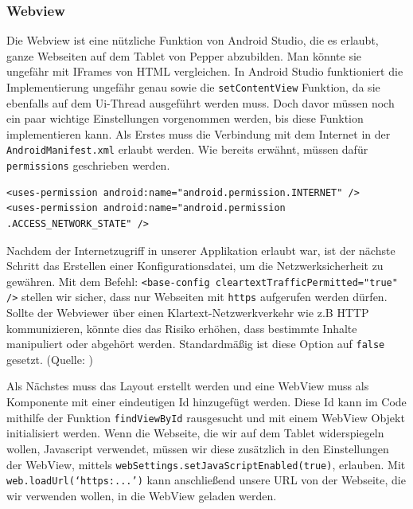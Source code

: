 \subsubsection{Webview}

Die Webview ist eine nützliche Funktion von Android Studio, die es erlaubt, ganze Webseiten auf dem Tablet von Pepper abzubilden. Man könnte sie ungefähr mit IFrames von HTML vergleichen. In Android Studio funktioniert die Implementierung ungefähr genau sowie die \verb|setContentView| Funktion, da sie ebenfalls auf dem Ui-Thread ausgeführt werden muss. Doch davor müssen noch ein paar wichtige Einstellungen vorgenommen werden, bis diese Funktion implementieren kann. Als Erstes muss die Verbindung mit dem Internet in der \verb|AndroidManifest.xml| erlaubt werden. Wie bereits erwähnt, müssen dafür \verb|permissions| geschrieben werden. \\

\begin{lstlisting}
<uses-permission android:name="android.permission.INTERNET" />
<uses-permission android:name="android.permission
.ACCESS_NETWORK_STATE" />
\end{lstlisting}

Nachdem der Internetzugriff in unserer Applikation erlaubt war, ist der nächste Schritt das Erstellen einer Konfigurationsdatei, um die Netzwerksicherheit zu gewähren. Mit dem Befehl: \verb|<base-config cleartextTrafficPermitted="true" />| stellen wir sicher, dass nur Webseiten mit \verb|https| aufgerufen werden dürfen.  %
Sollte der Webviewer über einen Klartext-Netzwerkverkehr wie z.B HTTP kommunizieren, könnte dies das Risiko erhöhen, dass bestimmte Inhalte manipuliert oder abgehört werden. Standardmäßig ist diese Option auf \verb|false| gesetzt. 
(Quelle: \cite{webview})

Als Nächstes muss das Layout erstellt werden und eine WebView muss als Komponente mit einer eindeutigen Id hinzugefügt werden. Diese Id kann im Code mithilfe der Funktion \verb|findViewById| rausgesucht und mit einem WebView Objekt initialisiert werden. Wenn die Webseite, die wir 
auf dem Tablet widerspiegeln wollen, Javascript verwendet, müssen wir diese zusätzlich in den Einstellungen der WebView, mittels \verb|webSettings.setJavaScriptEnabled(true)|, erlauben. Mit \verb|web.loadUrl(‘https:...’)| kann anschließend unsere URL von der Webseite, die wir verwenden wollen, in die WebView geladen werden. 

